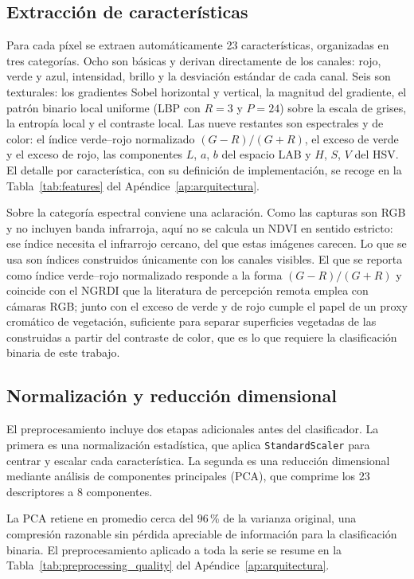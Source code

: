 \subsection{Extracción de características}

Para cada píxel se extraen automáticamente 23 características, organizadas en tres categorías. Ocho son básicas y derivan directamente de los canales: rojo, verde y azul, intensidad, brillo y la desviación estándar de cada canal. Seis son texturales: los gradientes Sobel horizontal y vertical, la magnitud del gradiente, el patrón binario local uniforme (LBP con $R = 3$ y $P = 24$) sobre la escala de grises, la entropía local y el contraste local. Las nueve restantes son espectrales y de color: el índice verde--rojo normalizado $(G-R)/(G+R)$, el exceso de verde y el exceso de rojo, las componentes $L$, $a$, $b$ del espacio LAB y $H$, $S$, $V$ del HSV. El detalle por característica, con su definición de implementación, se recoge en la Tabla~\ref{tab:features} del Apéndice~\ref{ap:arquitectura}.

Sobre la categoría espectral conviene una aclaración. Como las capturas son RGB y no incluyen banda infrarroja, aquí no se calcula un NDVI en sentido estricto: ese índice necesita el infrarrojo cercano, del que estas imágenes carecen. Lo que se usa son índices construidos únicamente con los canales visibles. El que se reporta como índice verde--rojo normalizado responde a la forma $(G-R)/(G+R)$ y coincide con el NGRDI que la literatura de percepción remota emplea con cámaras RGB; junto con el exceso de verde y de rojo cumple el papel de un proxy cromático de vegetación, suficiente para separar superficies vegetadas de las construidas a partir del contraste de color, que es lo que requiere la clasificación binaria de este trabajo.

\subsection{Normalización y reducción dimensional}

El preprocesamiento incluye dos etapas adicionales antes del clasificador. La primera es una normalización estadística, que aplica \texttt{StandardScaler} para centrar y escalar cada característica. La segunda es una reducción dimensional mediante análisis de componentes principales (PCA), que comprime los 23 descriptores a 8 componentes.

La PCA retiene en promedio cerca del $96$\,\% de la varianza original, una compresión razonable sin pérdida apreciable de información para la clasificación binaria. El preprocesamiento aplicado a toda la serie se resume en la Tabla~\ref{tab:preprocessing_quality} del Apéndice~\ref{ap:arquitectura}.

